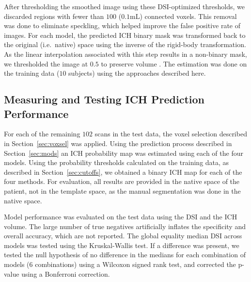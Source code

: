\documentclass{elsarticle_nonatbib}\usepackage[]{graphicx}\usepackage[]{color}
\begin{document}
After thresholding the smoothed image using these DSI-optimized thresholds, we discarded regions with fewer than $100$ ($0.1$mL) connected voxels.  This removal was done to eliminate speckling, which helped improve the false positive rate of images.  For each model, the predicted ICH binary mask was transformed back to the original (i.e.~native) space using the inverse of the rigid-body transformation.  As the linear interpolation associated with this step results in a non-binary mask, we thresholded the image at $0.5$ to preserve volume \cite{flirt_reg}.  The estimation was done on the training data ($10$ subjects) using the approaches described here.   



\subsection{Measuring and Testing ICH Prediction Performance}





For each of the remaining $102$ scans in the test data, the voxel selection described in Section~\ref{sec:voxsel} was applied. Using the prediction process described in Section~\ref{sec:mods} an ICH probability map was estimated using each of the four models.  Using the probability thresholds calculated on the training data, as described in Section~\ref{sec:cutoffs}, we obtained a binary ICH map for each of the four methods. For evaluation, all results are provided in 
the native space of the patient, not in the template space, as the manual segmentation was
done in the native space.

Model performance was evaluated on the test data using the DSI and the ICH volume. The large number of true negatives artificially inflates the specificity and overall accuracy, which are not reported.  The global equality median DSI across models was tested using the Kruskal-Wallis test.  If a difference was present, we tested the null hypothesis of no difference in the medians for each combination of models ($6$ combinations) using a Wilcoxon signed rank test, and corrected the p-value using a Bonferroni correction.
\end{document}
